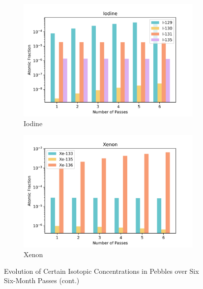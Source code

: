 \begin{figure}[H]
\centering
%
\begin{subfigure}{0.95\textwidth}
  \includegraphics[width=0.95\linewidth]{figures/compositions/iodine}
  \caption{Iodine}
  \label{fig:i}
\end{subfigure}%

\begin{subfigure}{0.95\textwidth}
  \includegraphics[width=0.95\linewidth]{figures/compositions/xenon}
  \caption{Xenon}
  \label{fig:xe}
\end{subfigure}%

\caption{Evolution of Certain Isotopic Concentrations in Pebbles over Six Six-Month Passes (cont.)}
\end{figure}

